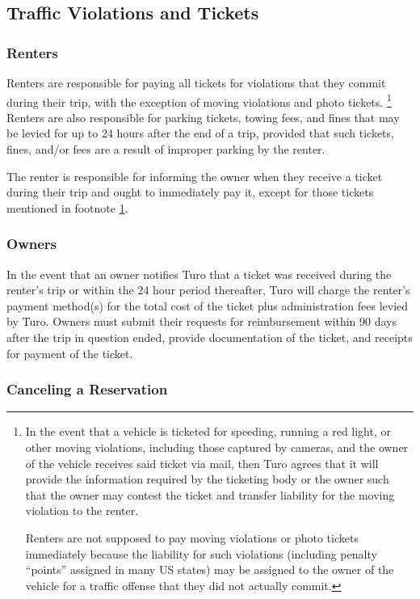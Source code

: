 \documentclass[review,12pt]{elsarticle}
\begin{document}
  \subsection{Traffic Violations and Tickets}
    \subsubsection{Renters}
    Renters are responsible for paying all tickets for violations that they commit during their trip, with the exception of moving violations and photo tickets.
      \footnote{\label{moving-violations}In the event that a vehicle is ticketed for speeding, running a red light, or other moving violations, including those captured by cameras, and the owner of the vehicle receives said ticket via mail, then Turo agrees that it will provide the information required by the ticketing body or the owner such that the owner may contest the ticket and transfer liability for the moving violation to the renter.

      Renters are not supposed to pay moving violations or photo tickets immediately because the liability for such violations (including penalty ``points'' assigned in many US states) may be assigned to the owner of the vehicle for a traffic offense that they did not actually commit.
      }
    Renters are also responsible for parking tickets, towing fees, and fines that may be levied for up to 24 hours after the end of a trip, provided that such tickets, fines, and/or fees are a result of improper parking by the renter.

    The renter is responsible for informing the owner when they receive a ticket during their trip and ought to immediately pay it, except for those tickets mentioned in footnote \ref{moving-violations}.

    \subsubsection{Owners}
    In the event that an owner notifies Turo that a ticket was received during the renter's trip or within the 24 hour period thereafter, Turo will charge the renter's payment method(s) for the total cost of the ticket plus administration fees levied by Turo. Owners must submit their requests for reimbursement within 90 days after the trip in question ended, provide documentation of the ticket, and receipts for payment of the ticket.

  \subsubsection{Canceling a Reservation}
\end{document}
